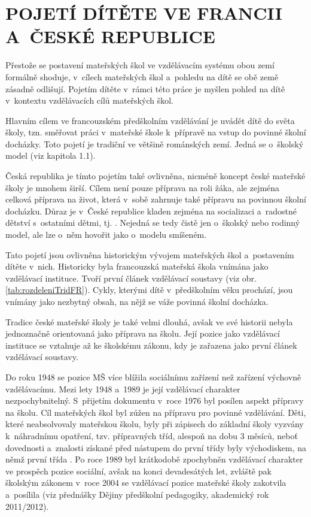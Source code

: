 \chapter{POJETÍ DÍTĚTE VE FRANCII A~ČESKÉ REPUBLICE}

Přestože se postavení mateřských škol ve vzdělávacím systému obou zemí formálně shoduje, v~cílech mateřských škol a~pohledu na dítě se obě země zásadně odlišují. Pojetím dítěte v~rámci této práce je myšlen pohled na dítě v~kontextu vzdělávacích cílů mateřských škol. 

Hlavním cílem ve francouzském předškolním vzdělávání je uvádět dítě do světa školy, tzn. směřovat práci v~mateřské škole k~přípravě na vstup do povinné školní docházky. Toto pojetí je tradiční ve většině románských zemí. Jedná se o~školský model (viz kapitola 1.1).

 Česká republika je tímto pojetím také ovlivněna, nicméně koncept české mateřské školy je mnohem širší. Cílem není pouze příprava na roli žáka, ale zejména celková příprava na život, která v~sobě zahrnuje také přípravu na povinnou školní docházku. Důraz je v~České republice kladen zejména na socializaci a~radostné dětství s~ostatními dětmi, tj. . Nejedná se tedy čistě jen o~školský nebo rodinný model, ale lze o~něm hovořit jako o~modelu smíšeném. 

 Tato pojetí jsou ovlivněna historickým vývojem mateřských škol a~postavením dítěte v~nich. Historicky byla francouzská mateřská škola vnímána jako vzdělávací instituce. Tvoří první článek vzdělávací soustavy (viz obr. \ref{tab:rozdeleniTridFR}). Cykly, kterými dítě v~předškolním věku prochází, jsou vnímány jako nezbytný obsah, na nějž se váže povinná školní docházka. 

Tradice české mateřské školy je také velmi dlouhá, avšak ve své historii nebyla jednoznačně orientovaná jako příprava na školu. Její pozice jako vzdělávací instituce se vztahuje až ke školskému zákonu, kdy je zařazena jako první článek vzdělávací soustavy. 

 Do roku 1948 se pozice MŠ více blížila sociálnímu zařízení než zařízení výchovně vzdělávacímu. Mezi lety 1948 a~1989 je její vzdělávací charakter nezpochybnitelný. S~přijetím dokumentu  v~roce 1976 byl posílen aspekt přípravy na školu. Cíl mateřských škol byl zúžen na přípravu pro povinné vzdělávání. Děti, které neabsolvovaly mateřskou školu, byly při zápisech do základní školy vyzvány k~náhradnímu opatření, tzv. přípravných tříd, alespoň na dobu 3 měsíců, neboť dovednosti a~znalosti získané před nástupem do první třídy byly východiskem, na němž první třída . Po roce 1989 byl krátkodobě zpochybněn vzdělávací charakter ve prospěch pozice sociální, avšak na konci devadesátých let, zvláště pak školským zákonem v~roce 2004 se vzdělávací pozice mateřské školy zakotvila a~posílila (viz přednášky Dějiny předškolní pedagogiky, akademický rok 2011/2012).

